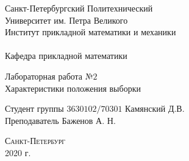\documentclass[a4]{article}
\begin{document}
\def\contentsname{\LARGE{Содержание}}
\thispagestyle{empty}
\begin{center} 
\vspace{2cm} 
{\Large \sc Санкт-Петербургский Политехнический}\\
\vspace{2mm}
{\Large \sc Университет} им. {\Large\sc Петра Великого}\\
\vspace{1cm}
{\large \sc Институт прикладной математики и механики\\ 
\vspace{0.5mm}
\textsc{}}\\ 
\vspace{0.5mm}
{\large\sc Кафедра прикладной математики}\\
\vspace{15mm}
{\huge \sc Лабораторная работа №$2$\\
	Характеристики положения выборки
	\vspace{6mm}
	
}
\vspace*{2mm}
\vspace{6cm} 
Студент группы $3630102/70301$ \hfill Камянский Д.В.\\
\vspace{1cm}
Преподаватель \hfill Баженов А. Н.\\
\vspace{20mm} 


\vfill {\large\textsc{Санкт-Петербург}}\\ 
2020 г.
\end{center}


\newpage
\pagestyle{plain}

\end{document}
